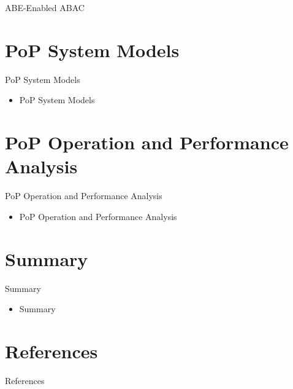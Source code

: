 \documentclass[11pt]{beamer}
\begin{document}
\begin{frame}{ABE-Enabled ABAC}

\end{frame}

\section{PoP System Models}
\begin{frame}{PoP System Models}
\begin{itemize}
	\item PoP System Models
\end{itemize}
\end{frame}

\section{PoP Operation and Performance Analysis}
\begin{frame}{PoP Operation and Performance Analysis}
\begin{itemize}
	\item PoP Operation and Performance Analysis
\end{itemize}
\end{frame}

\section{Summary}
\begin{frame}{Summary}
\begin{itemize}
	\item Summary
\end{itemize}
\end{frame}

\section{References}
\begin{frame}[allowframebreaks]{References}
\printbibliography
\end{frame}
\end{document}
